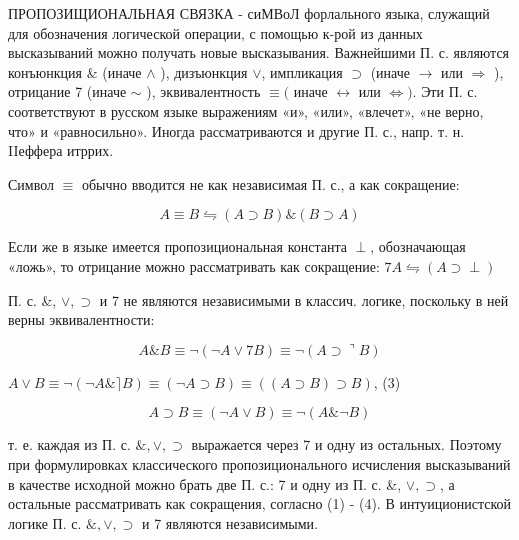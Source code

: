 \documentclass[10pt]{article}
\begin{document}
ПРОПОЗИЩИОНАЛЬНАЯ СВЯЗКА - сиМВоЛ форлального языка, служащий для обозначения логической операции, с помощью к-рой из данных высказываний можно получать новые высказывания. Важнейшими П. с. являются конъюнкция \& (иначе $\wedge$ ), дизъюнкция $\vee$, импликация $\supset$ (иначе $\rightarrow$ или $\Rightarrow$ ), отрицание 7 (иначе $\sim$ ), эквивалентность $\equiv($ иначе $\leftrightarrow$ или $\Leftrightarrow)$. Эти П. с. соответствуют в русском языке выражениям «и», «или», «влечет», «не верно, что» и «равносильно». Иногда рассматриваются и другие П. с., напр. т. н. IIеффера итррих.



Символ $\equiv$ обычно вводится не как независимая П. с., а как сокращение:



\[

A \equiv B \leftrightharpoons(A \supset B) \&(B \supset A)

\]



Если же в языке имеется пропозициональная константа $\perp$, обозначающая «ложь», то отрицание можно рассматривать как сокращение: $7 A \leftrightharpoons(A \supset \perp)$



П. с. \&, $\vee, \supset$ и 7 не являются независимыми в классич. логике, поскольку в ней верны эквивалентности:



\[

A \& B \equiv \neg(\neg A \vee 7 B) \equiv \neg(A \supset\urcorner B)

\]



$A \vee B \equiv \neg(\neg A \&\rceil B) \equiv(\neg A \supset B) \equiv((A \supset B) \supset B)$, (3)



\[

A \supset B \equiv(\neg A \vee B) \equiv \neg(A \& \neg B)

\]



т. е. каждая из П. с. $\&, \vee, \supset$ выражается через 7 и одну из остальных. Поэтому при формулировках классического пропозиционального исчисления высказываний в качестве исходной можно брать две П. с.: 7 и одну из П. с. \&, $\vee, \supset$, а остальные рассматривать как сокращения, согласно (1) - (4). В интуиционистской логике П. с. $\&, \vee, \supset$ и 7 являются независимыми.
\end{document}
